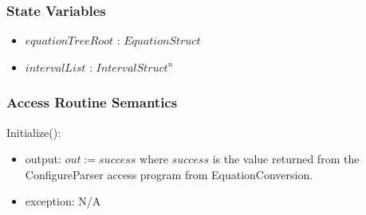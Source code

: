 \documentclass[12pt, titlepage]{article}
\begin{document}
\subsubsection{State Variables}

\begin{itemize}
	\item $equationTreeRoot$ : $EquationStruct$
	\item $intervalList$ : $IntervalStruct^n$
\end{itemize}

\newpage
\subsubsection{Access Routine Semantics}

\noindent Initialize():
\begin{itemize}
	\item output: $out := success$ where $success$ is the value returned from 
	the ConfigureParser access program from EquationConversion. 
	\item exception: N/A
\end{itemize}
\end{document}
